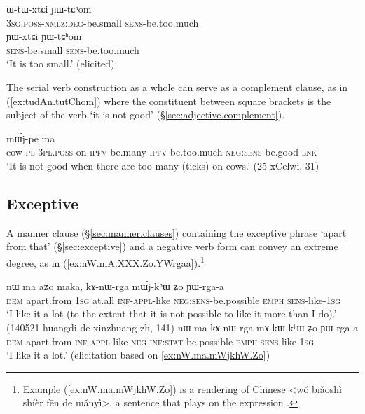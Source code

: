 \begin{exe}
\ex 
\begin{xlist}
\ex  \label{ex:WtWxtCi.YWtChom}
\gll ɯ-tɯ-xtɕi ɲɯ-tɕʰom \\
\textsc{3sg}.\textsc{poss}-\textsc{nmlz}:\textsc{deg}-be.small \textsc{sens}-be.too.much \\
\ex  \label{ex:YWxtCi.YWtChom}
\gll ɲɯ-xtɕi ɲɯ-tɕʰom \\
\textsc{sens}-be.small \textsc{sens}-be.too.much \\
\glt `It is too small.' (elicited)
\end{xlist}
\end{exe}

The serial verb construction as a whole can serve as a complement clause, as in (\ref{ex:tudAn.tutChom}) where the constituent between square brackets is the subject of the verb  `it is not good' (§\ref{sec:adjective.complement}).

\begin{exe}
\ex \label{ex:tudAn.tutChom}
 mɯ́j-pe ma \\
cow \textsc{pl} \textsc{3pl}.\textsc{poss}-on \textsc{ipfv}-be.many \textsc{ipfv}-be.too.much \textsc{neg}:\textsc{sens}-be.good \textsc{lnk} \\
\glt `It is not good when there are too many (ticks) on cows.' (25-xCelwi, 31)
\end{exe}

\subsection{Exceptive}
A manner clause (§\ref{sec:manner.clauses}) containing the exceptive phrase  `apart from that' (§\ref{sec:exceptive}) and a negative verb form can convey an extreme degree, as in (\ref{ex:nW.mA.XXX.Zo.YWrgaa}).\footnote{Example (\ref{ex:nW.ma.mWjkhW.Zo}) is a rendering of Chinese  <wǒ biǎoshì shíèr fēn de mǎnyì>, a sentence that plays on the expression . 
}

\begin{exe}
\ex \label{ex:nW.mA.XXX.Zo.YWrgaa}
\begin{xlist}
\ex \label{ex:nW.ma.mWjkhW.Zo}
\gll  nɯ ma aʑo maka, kɤ-nɯ-rga mɯ́j-kʰɯ ʑo ɲɯ-rga-a \\
\textsc{dem} apart.from \textsc{1sg} at.all \textsc{inf}-\textsc{appl}-like \textsc{neg}:\textsc{sens}-be.possible \textsc{emph} \textsc{sens}-like-\textsc{1sg} \\
\glt `I like it a lot (to the extent that it is not possible to like it more than I do).' (140521 huangdi de xinzhuang-zh, 141)
\ex \label{ex:nW.ma.mAkWkhW.Zo}
\gll  nɯ ma kɤ-nɯ-rga mɤ-kɯ-kʰɯ ʑo ɲɯ-rga-a \\
\textsc{dem} apart.from \textsc{inf}-\textsc{appl}-like \textsc{neg}-\textsc{inf}:\textsc{stat}-be.possible \textsc{emph} \textsc{sens}-like-\textsc{1sg} \\
\glt `I like it a lot.' (elicitation based on \ref{ex:nW.ma.mWjkhW.Zo})
\end{xlist}
\end{exe}


